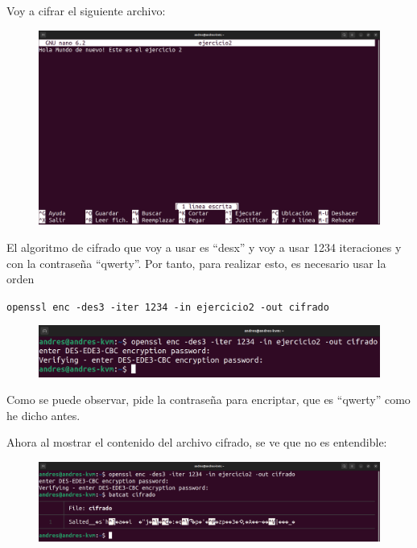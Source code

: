 \documentclass{article}
\begin{document}
Voy a cifrar el siguiente archivo:

\begin{figure}[H]
    \includegraphics[width=\textwidth]{imagenes/Captura desde 2022-10-19 17-33-08.png}
\end{figure}

El algoritmo de cifrado que voy a usar es ``desx'' y voy a usar 1234 iteraciones y con la contraseña ``qwerty''. Por tanto, para realizar esto, es necesario usar la orden 

\verb|openssl enc -des3 -iter 1234 -in ejercicio2 -out cifrado|

\begin{figure}[H]
    \includegraphics[width=\textwidth]{imagenes/Captura desde 2022-10-19 17-44-41.png}
\end{figure}

Como se puede observar, pide la contraseña para encriptar, que es ``qwerty'' como he dicho antes. 

\bigskip

Ahora al mostrar el contenido del archivo cifrado, se ve que no es entendible:

\begin{figure}[H]
    \includegraphics[width=\textwidth]{imagenes/Captura desde 2022-10-19 17-44-49.png}
\end{figure}
\end{document}
